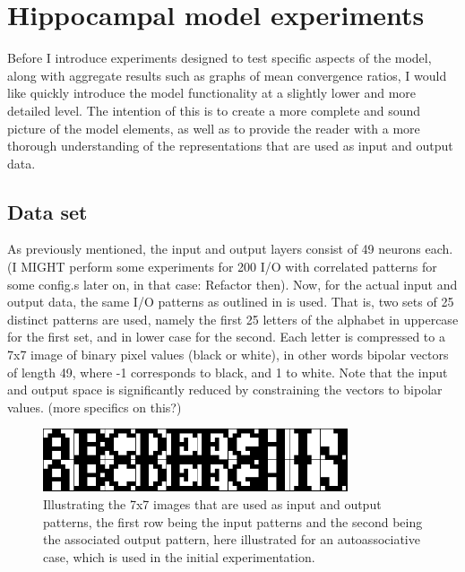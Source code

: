 \section{Hippocampal model experiments}\label{section:hpc-experiments}

Before I introduce experiments designed to test specific aspects of the model, along with aggregate results such as graphs of mean convergence ratios, I would like quickly introduce the model functionality at a slightly lower and more detailed level. The intention of this is to create a more complete and sound picture of the model elements, as well as to provide the reader with a more thorough understanding of the representations that are used as input and output data. 

\subsection{Data set}
As previously mentioned, the input and output layers consist of 49 neurons each. (I MIGHT perform some experiments for 200 I/O with correlated patterns for some config.s later on, in that case: Refactor then). Now, for the actual input and output data, the same I/O patterns as outlined in \citep{Hattori2010, Hattori2014} is used. That is, two sets of 25 distinct patterns are used, namely the first 25 letters of the alphabet in uppercase for the first set, and in lower case for the second. Each letter is compressed to a 7x7 image of binary pixel values (black or white), in other words bipolar vectors of length 49, where -1 corresponds to black, and 1 to white. Note that the input and output space is significantly reduced by constraining the vectors to bipolar values. (more specifics on this?)

\begin{figure}\label{fig:sample_letters}
    \centering
    \includegraphics[width=9cm]{fig/im_both.png}
    \caption{Illustrating the 7x7 images that are used as input and output patterns, the first row being the input patterns and the second being the associated output pattern, here illustrated for an autoassociative case, which is used in the initial experimentation.}
\end{figure}

